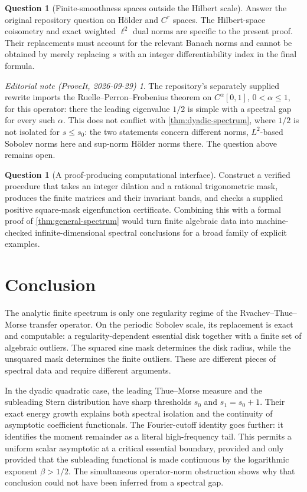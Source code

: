 \documentclass[11pt,a4paper]{article}
\theoremstyle{definition}
\newtheorem{question}[theorem]{Question}
\theoremstyle{remark}
\newtheorem*{ednote}{Editorial note (ProveIt, 2026-09-29)}
\numberwithin{equation}{section}
\begin{document}
\begin{question}[Finite-smoothness spaces outside the Hilbert scale]
Answer the original repository question on H\"older and $C^r$ spaces.
The Hilbert-space coisometry and exact weighted $\ell^2$ dual norms are
specific to the present proof. Their replacements must account for the
relevant Banach norms and cannot be obtained by merely replacing $s$ with
an integer differentiability index in the final formula.
\end{question}
\begin{ednote}
The repository's separately supplied rewrite
 imports the
Ruelle--Perron--Frobenius theorem on $C^\alpha[0,1]$, $0<\alpha\le1$, for
this operator: there the leading eigenvalue $1/2$ is simple with a spectral
gap for every such $\alpha$. This does not conflict with
\cref{thm:dyadic-spectrum}, where $1/2$ is not isolated for $s\le s_0$: the
two statements concern different norms, $L^2$-based Sobolev norms here and
sup-norm H\"older norms there. The question above remains open.
\end{ednote}

\begin{question}[A proof-producing computational interface]
Construct a verified procedure that takes an integer dilation and a rational
trigonometric mask, produces the finite matrices and their invariant bands,
and checks a supplied positive square-mask eigenfunction certificate.
Combining this with a formal proof of \cref{thm:general-spectrum} would
turn finite algebraic data into machine-checked infinite-dimensional
spectral conclusions for a broad family of explicit examples.
\end{question}

\section{Conclusion}
The analytic finite spectrum is only one regularity regime of the
Rvachev--Thue--Morse transfer operator. On the periodic Sobolev scale,
its replacement is exact and computable: a regularity-dependent essential
disk together with a finite set of algebraic outliers. The squared sine
mask determines the disk radius, while the unsquared mask determines the
finite outliers. These are different pieces of spectral data and require
different arguments.

In the dyadic quadratic case, the leading Thue--Morse measure and the
subleading Stern distribution have sharp thresholds $s_0$ and $s_1=s_0+1$.
Their exact energy growth explains both spectral isolation and the
continuity of asymptotic coefficient functionals. The Fourier-cutoff
identity goes further: it identifies the moment remainder as a literal
high-frequency tail. This permits a uniform scalar asymptotic at a
critical essential boundary, provided and only provided that the
subleading functional is made continuous by the logarithmic exponent
$\beta>1/2$. The simultaneous operator-norm obstruction shows why that
conclusion could not have been inferred from a spectral gap.
\end{document}
